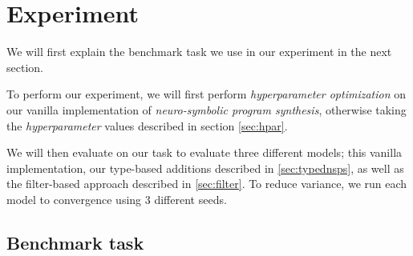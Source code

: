 \documentclass{article}
\begin{document}

\section{Experiment} \label{sec:experiment}

We will first explain the benchmark task we use in our experiment in
the next section.

To perform our experiment, we will
first perform \emph{hyperparameter optimization} on our vanilla implementation of \emph{neuro-symbolic program synthesis},
otherwise taking the \emph{hyperparameter} values described in section \ref{sec:hpar}.

We will then evaluate on our task to evaluate three different models;
this vanilla implementation, our type-based additions described in \ref{sec:typednsps},
as well as the filter-based approach described in \ref{sec:filter}.
To reduce variance, we run each model to convergence using $3$ different seeds.

\subsection{Benchmark task} \label{sec:task}

\end{document}
